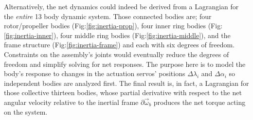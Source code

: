 \par
Alternatively, the net dynamics could indeed be derived from a Lagrangian for the \emph{entire} 13 body dynamic system. Those connected bodies are; four rotor/propeller bodies (Fig:\ref{fig:inertia-prop}), four inner ring bodies (Fig:\ref{fig:inertia-inner}), four middle ring bodies (Fig:\ref{fig:inertia-middle}), and the frame structure (Fig:\ref{fig:inertia-frame}) and each with six degrees of freedom. Constraints on the assembly's joints would eventually reduce the degrees of freedom and simplify solving for net responses. The purpose here is to model the body's response to changes in the actuation servos' positions $\Delta\lambda_i$ and $\Delta\alpha_i$ so independent bodies are analyzed first. The final result is, in fact, a Lagrangian for those collective thirteen bodies, whose partial derivative with respect to the net angular velocity relative to the inertial frame $\partial\vec{\omega}_b$ produces the net torque acting on the system.

